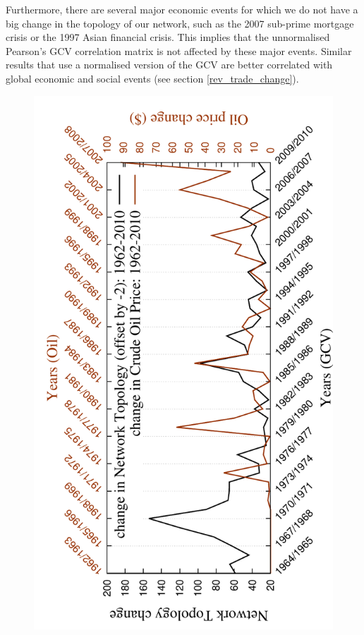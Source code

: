 Furthermore, there are several major economic events for which we do not have a big change in the topology of our network, such as the 2007 sub-prime mortgage crisis or the 1997 Asian financial crisis. This implies that the unnormalised Pearson's GCV correlation matrix is not affected by these major events. Similar results that use a normalised version of the GCV are better correlated with global economic and social events (see section \ref{rev_trade_change}).

\begin{figure}[H]
  \centering
  \includegraphics[angle=-90,scale=0.6]{../code/final_results/all_trade_thresh/change_over_time2}

\end{figure}
